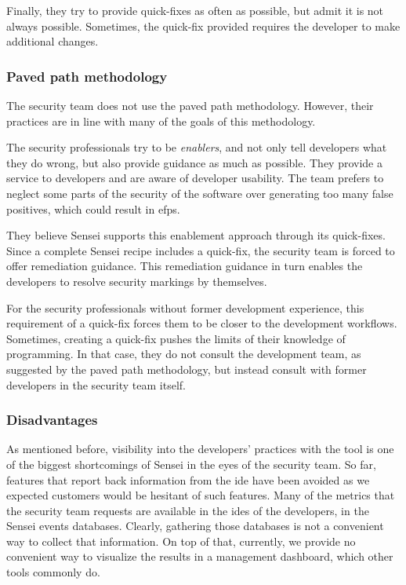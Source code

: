 Finally, they try to provide quick-fixes as often as possible, but admit it is not always possible.
Sometimes, the quick-fix provided requires the developer to make additional changes.

\subsubsection{Paved path methodology}
The security team does not use the paved path methodology.
However, their practices are in line with many of the goals of this methodology.

The security professionals try to be \textit{enablers}, and not only tell developers what they do wrong, but also provide guidance as much as possible.
They provide a service to developers and are aware of developer usability.
The team prefers to neglect some parts of the security of the software over generating too many false positives, which could result in \glspl{efp}.

They believe Sensei supports this enablement approach through its quick-fixes.
Since a complete Sensei recipe includes a quick-fix, the security team is forced to offer remediation guidance.
This remediation guidance in turn enables the developers to resolve security markings by themselves.

For the security professionals without former development experience, this requirement of a quick-fix forces them to be closer to the development workflows.
Sometimes, creating a quick-fix pushes the limits of their knowledge of programming.
In that case, they do not consult the development team, as suggested by the paved path methodology, but instead consult with former developers in the security team itself.

\subsubsection{Disadvantages}
As mentioned before, visibility into the developers' practices with the tool is one of the biggest shortcomings of Sensei in the eyes of the security team.
So far, features that report back information from the \gls{ide} have been avoided as we expected customers would be hesitant of such features.
Many of the metrics that the security team requests are available in the \glspl{ide} of the developers, in the Sensei events databases.
Clearly, gathering those databases is not a convenient way to collect that information.
On top of that, currently, we provide no convenient way to visualize the results in a management dashboard, which other tools commonly do.


